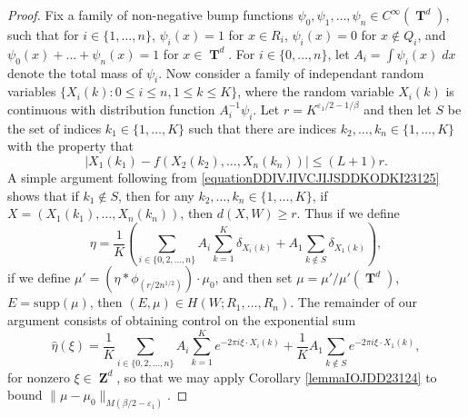 \documentclass[12pt,reqno]{article}
\numberwithin{equation}{section}
\DeclareMathOperator{\ZZ}{\mathbf{Z}}
\DeclareMathOperator{\TT}{\mathbf{T}}
\numberwithin{theorem}{section}
\begin{document}
\begin{proof}
    Fix a family of non-negative bump functions $\psi_0,\psi_1,\dots,\psi_n \in C^\infty(\TT^d)$, such that for $i \in \{ 1,\dots,n \}$, $\psi_i(x) = 1$ for $x \in R_i$, $\psi_i(x) = 0$ for $x \not \in Q_i$, and $\psi_0(x) + \dots + \psi_n(x) = 1$ for $x \in \TT^d$. For $i \in \{ 0, \dots, n \}$, let $A_i = \int \psi_i(x)\; dx$ denote the total mass of $\psi_i$. Now consider a family of independant random variables $\{ X_i(k) : 0 \leq i \leq n, 1 \leq k \leq K \}$, where the random variable $X_i(k)$ is continuous with distribution function $A_i^{-1} \psi_i$. Let $r = K^{\varepsilon_1/2 - 1/\beta}$
    and then let $S$ be the set of indices $k_1 \in \{ 1, \dots, K \}$ such that there are indices $k_2,\dots,k_n \in \{ 1,\dots,K \}$ with the property that
    \begin{equation} \label{equationDDIVJIVCJIJSDDKODKI23125}
        |X_1(k_1) - f(X_2(k_2),\dots,X_n(k_n))| \leq (L+1)r.
    \end{equation}
    A simple argument following from \eqref{equationDDIVJIVCJIJSDDKODKI23125} shows that if $k_1 \not \in S$, then for any $k_2,\dots,k_n \in \{ 1, \dots, K \}$, if $X = (X_1(k_1),\dots,X_n(k_n))$, then $d(X,W) \geq r$. Thus if we define
    \[ \eta = \frac{1}{K} \left( \sum_{i \in \{ 0, 2, \dots, n \}} A_i \sum_{k = 1}^K \delta_{X_i(k)} + A_1 \sum_{k \not \in S} \delta_{X_1(k)} \right), \]
    if we define $\mu' = (\eta * \phi_{(r/2n^{1/2})}) \cdot \mu_0$, and then set $\mu = \mu'/\mu'(\TT^d)$, $E = \text{supp}(\mu)$, then $(E,\mu) \in H(W;R_1,\dots,R_n)$. The remainder of our argument consists of obtaining control on the exponential sum
    \begin{equation} \label{equationIODJOIVJIO}
        \widehat{\eta}(\xi) = \frac{1}{K} \sum_{i \in \{ 0, 2, \dots, n \}} A_i \sum_{k = 1}^K e^{-2 \pi i \xi \cdot X_i(k)} + \frac{1}{K} A_1 \sum_{k \not \in S} e^{-2 \pi i \xi \cdot X_1(k)},
    \end{equation}
    for nonzero $\xi \in \ZZ^d$, so that we may apply Corollary \ref{lemmaIOJDD23124} to bound $\| \mu - \mu_0 \|_{M(\beta/2-\varepsilon_1)}$.


\end{proof}
\end{document}
